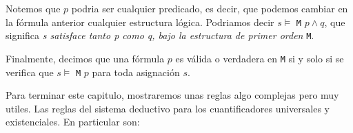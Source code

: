 \documentclass{article}
\begin{document}
Notemos que $p$ podria ser cualquier predicado, es decir, que podemos cambiar en la fórmula anterior cualquier estructura lógica. Podriamos decir $s \models$ \texttt{M} $p \land q$, que significa \textit{s satisface tanto p como q, bajo la estructura de primer orden} \texttt{M}.

Finalmente, decimos que una fórmula $p$ es válida o verdadera en \texttt{M} si y solo si se verifica que $s \models$ \texttt{M} $p$ para toda asignación $s$.

Para terminar este capitulo, mostraremos unas reglas algo complejas pero muy utiles. Las reglas del sistema deductivo para los cuantificadores universales y existenciales. En particular son:

\begin{center}
\end{center}
\end{document}
